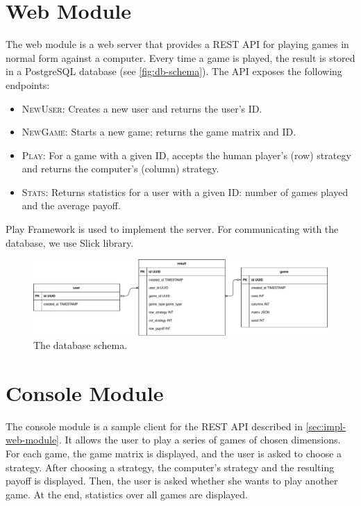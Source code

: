 \section{Web Module}
\label{sec:impl-web-module}
The web module is a web server that provides a REST API for playing games in normal form against a computer.
Every time a game is played, the result is stored in a PostgreSQL database (see \autoref{fig:db-schema}).
The API exposes the following endpoints:
\begin{itemize}
	\item \textsc{NewUser}: Creates a new user and returns the user's ID.
	\item \textsc{NewGame}: Starts a new game; returns the game matrix and ID.
	\item \textsc{Play}: For a game with a given ID, accepts the human player's (row) strategy and returns the computer's (column) strategy.
	\item \textsc{Stats}: Returns statistics for a user with a given ID: number of games played and the average payoff.
\end{itemize}

Play Framework is used to implement the server.
For communicating with the database, we use Slick library.

\begin{figure}
	\hspace{-1cm}
	\includegraphics[width=14cm]{fig/schema.pdf}
	\caption{The database schema.}
	\label{fig:db-schema}
\end{figure}

\section{Console Module}
The console module is a sample client for the REST API described in \autoref{sec:impl-web-module}.
It allows the user to play a series of games of chosen dimensions.
For each game, the game matrix is displayed, and the user is asked to choose a strategy.
After choosing a strategy, the computer's strategy and the resulting payoff is displayed.
Then, the user is asked whether she wants to play another game.
At the end, statistics over all games are displayed.

